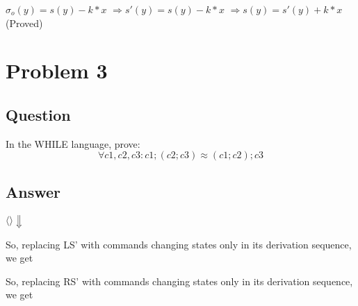 \documentclass[a4paper, 11pt]{article}
\begin{document}
$\sigma_o(y) = s(y) - k*x $ \newline
$\Rightarrow s'(y) = s(y) - k*x $\newline
$\Rightarrow s(y) = s'(y) + k*x $ (Proved)

\section{Problem 3}

\subsection{Question}
In the WHILE language, prove:
$$\forall c1, c2, c3 : c1; (c2; c3) \approx (c1; c2); c3$$

\subsection{Answer}

$\langle  \rangle \Downarrow $
\begin{prooftree}
     
  
\end{prooftree}
So, replacing LS' with commands changing states only in its derivation sequence, we get

\begin{prooftree}
 

\end{prooftree}

\begin{prooftree}
  
\end{prooftree}
So, replacing RS' with commands changing states only in its derivation sequence, we get
\end{document}

